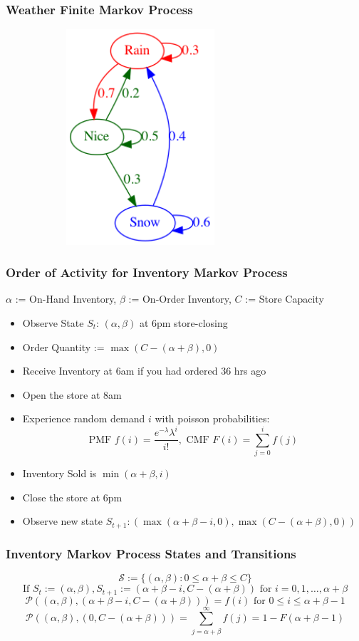 \documentclass[handout]{beamer}
\begin{document}
\begin{frame}
\frametitle{Weather Finite Markov Process}
\includegraphics[width=10cm, height=8cm]{weather_mp.png}
\end{frame}


\begin{frame}
\frametitle{Order of Activity for Inventory Markov Process}
\pause
$\alpha$ := On-Hand Inventory, $\beta$ := On-Order Inventory, $C$ := Store Capacity
\pause
\begin{itemize}[<+->]
\item Observe State $S_t$: $(\alpha, \beta)$ at 6pm store-closing
\item Order Quantity := $\max(C - (\alpha + \beta), 0)$
\item Receive Inventory at 6am if you had ordered 36 hrs ago
\item Open the store at 8am
\item Experience random demand $i$ with poisson probabilities:
$$\text{PMF } f(i) = \frac {e^{-\lambda} \lambda^i} {i!}, \text{ CMF } F(i) = \sum_{j=0}^i f(j)$$
\item Inventory Sold is $\min(\alpha + \beta, i)$
\item Close the store at 6pm
\item Observe new state $S_{t+1}: (\max(\alpha + \beta - i, 0), \max(C - (\alpha + \beta), 0))$
\end{itemize}
\end{frame}

\begin{frame}
\frametitle{Inventory Markov Process States and Transitions}
\pause
$$\mathcal{S} := \{(\alpha, \beta) : 0 \leq \alpha + \beta \leq C\}$$
\pause
$$\text{If } S_t := (\alpha, \beta), S_{t+1} := (\alpha + \beta - i, C - (\alpha + \beta)) \text{ for } i =0, 1, \ldots, \alpha + \beta$$
\pause
$$\mathcal{P}((\alpha, \beta), (\alpha + \beta - i, C - (\alpha + \beta))) = f(i)\text{ for } 0 \leq i \leq \alpha + \beta - 1$$
\pause
$$\mathcal{P}((\alpha, \beta), (0, C - (\alpha + \beta))) = \sum_{j=\alpha+\beta}^{\infty} f(j) = 1 - F(\alpha + \beta - 1)$$
\end{frame}
\end{document}
